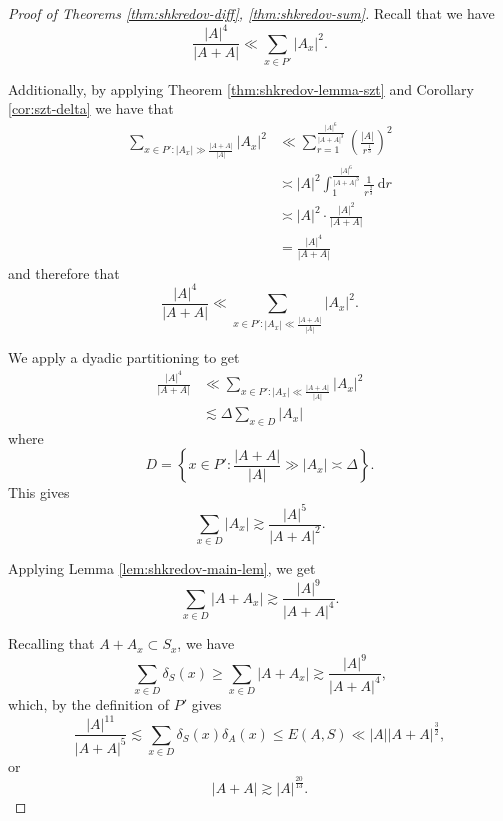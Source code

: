 \documentclass[12pt,reqno]{amsart}
\begin{document}
\begin{proof}[Proof of Theorems \ref{thm:shkredov-diff}, \ref{thm:shkredov-sum}]
Recall that we have 
\[
    \frac{\left\lvert A \right\rvert ^{4}}{\left\lvert A+A \right\rvert } \ll \sum _{x \in P'} \left\lvert A_{x}  \right\rvert ^{2}
.\]

Additionally, by applying Theorem \ref{thm:shkredov-lemma-szt} and Corollary \ref{cor:szt-delta}
we have that
\begin{align*}
\sum _{x \in P' : \left\lvert A_{x}  \right\rvert \gg \frac{\left\lvert A+A \right\rvert }{\left\lvert A \right\rvert } } \left\lvert A_{x}  \right\rvert ^{2} & \ll \sum_{r=1}^{\frac{\left\lvert A \right\rvert ^{6}}{\left\lvert A+A \right\rvert ^{3} } } \left( \frac{\left\lvert A \right\rvert }{r^{\frac{1}{3} }}  \right) ^{2} \\
& \asymp \left\lvert A \right\rvert ^{2} \int_{1}^{\frac{\left\lvert A \right\rvert ^{6}}{\left\lvert A+A \right\rvert ^{3} } }\frac{1}{r^{\frac{2}{3} }}   ~\mathrm{d} r\\
& \asymp \left\lvert A \right\rvert ^{2} \cdot \frac{\left\lvert A \right\rvert ^{2}}{\left\lvert A+A \right\rvert } \\
& =\frac{\left\lvert A \right\rvert ^{4}}{\left\lvert A+A \right\rvert } 
\end{align*}
and therefore that
\[
    \frac{\left\lvert A \right\rvert ^{4}}{\left\lvert A+A \right\rvert } \ll \sum _{x \in P' : \left\lvert A_{x}  \right\rvert \ll \frac{\left\lvert A+A \right\rvert }{\left\lvert A \right\rvert } } \left\lvert A_{x}  \right\rvert ^{2}
.\]

We apply a dyadic partitioning to get
\begin{align*}
\frac{\left\lvert A \right\rvert ^{4}}{\left\lvert A+A \right\rvert } &  \ll \sum _{x \in P' : \left\lvert A_{x}  \right\rvert \ll \frac{\left\lvert A+A \right\rvert }{\left\lvert A \right\rvert } } \left\lvert A_{x}  \right\rvert ^{2}\\
& \lesssim \Delta \sum _{x \in D} \left\lvert A_{x}  \right\rvert 
\end{align*}
where
\[
    D = \left\{ x \in P' : \frac{\left\lvert A+A \right\rvert }{\left\lvert A \right\rvert }  \gg \left\lvert A_{x}  \right\rvert \asymp \Delta \right\} 
.\]
This gives
\[
    \sum _{x \in D} \left\lvert A_{x}  \right\rvert \gtrsim \frac{\left\lvert A \right\rvert ^{5}}{\left\lvert A+A \right\rvert ^{2}} 
.\]

Applying Lemma \ref{lem:shkredov-main-lem}, we get
\[
    \sum _{x \in D} \left\lvert A + A_{x}  \right\rvert \gtrsim \frac{\left\lvert A \right\rvert ^{9}}{\left\lvert A+A \right\rvert ^{4}} 
.\]

Recalling that \(A + A_{x} \subset S_{x} \), we have
\[
    \sum _{x \in D} \delta_{S} (x) \geq \sum _{x \in D} \left\lvert A + A_{x}  \right\rvert \gtrsim \frac{\left\lvert A \right\rvert ^{9}}{\left\lvert A+A \right\rvert ^{4}} 
,\]
which, by the definition of \(P'\) gives
\[
    \frac{\left\lvert A \right\rvert ^{11}}{\left\lvert A+A \right\rvert ^{5}} \lesssim \sum _{x \in D} \delta_{S} (x) \delta_{A} (x) \leq E(A,S) \ll \left\lvert A \right\rvert \left\lvert A+A \right\rvert ^{\frac{3}{2} }
,\]
or
\[
    \left\lvert A+A \right\rvert \gtrsim \left\lvert A \right\rvert ^{\frac{20}{13} }
.\]
\end{proof}
\end{document}
